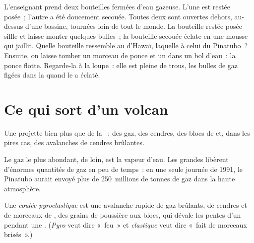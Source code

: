 \begin{inthelab}
L'enseignant prend deux bouteilles fermées d'eau gazeuse. L'une est restée
posée~; l'autre a été doucement secouée. Toutes deux sont ouvertes dehors,
au-dessus d'une bassine, tournées loin de tout le monde. La bouteille
restée posée siffle et laisse monter quelques bulles~; la bouteille
secouée éclate en une mousse qui jaillit. Quelle bouteille ressemble au
 d'Hawaï, laquelle à celui du Pinatubo~? Ensuite, on laisse tomber un
morceau de ponce et un  dans un bol d'eau~: la ponce flotte.
Regarde-la à la loupe~: elle est pleine de trous, les bulles de gaz figées
dans la  quand le  a éclaté.
\end{inthelab}

\section{Ce qui sort d'un volcan}

Une  projette bien plus que de la ~: des gaz, des cendres, des
blocs de  et, dans les pires cas, des avalanches de cendres
brûlantes.

Le gaz le plus abondant, de loin, est la vapeur d'eau. Les grandes
 libèrent d'énormes quantités de gaz en peu de temps~: en une
seule journée de 1991, le Pinatubo aurait envoyé plus de 250~millions de
tonnes de gaz dans la haute atmosphère.

\begin{definition}\label{def:g7:volcanoes:pyroclastic-flow}
Une \emph{coulée pyroclastique}
est une avalanche rapide de gaz brûlants, de cendres et de morceaux de
, des grains de poussière aux blocs, qui dévale les pentes d'un 
pendant une . (\emph{Pyro} veut dire «~feu~» et
\emph{clastique} veut dire «~fait de morceaux brisés~».)
\end{definition}

